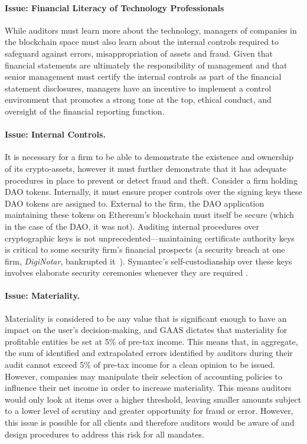\paragraph{Issue: Financial Literacy of Technology Professionals} While auditors must learn more about the technology, managers of companies in the blockchain space must also learn about the internal controls required to safeguard against errors, misappropriation of assets and fraud. Given that financial statements are ultimately the responsibility of management and that senior management must certify the internal controls as part of the financial statement disclosures, managers have an incentive to implement a control environment that promotes a strong tone at the top, ethical conduct, and oversight of the financial reporting function.

\paragraph{Issue: Internal Controls.} It is necessary for a firm to be able to demonstrate the existence and ownership of its crypto-assets, however it must further demonstrate that it has adequate procedures in place to prevent or detect fraud and theft. Consider a firm holding DAO tokens. Internally, it must ensure proper controls over the signing keys these DAO tokens are assigned to. External to the firm, the DAO application maintaining these tokens on Ethereum{'}s blockchain must itself be secure (which in the case of the DAO, it was not). Auditing internal procedures over cryptographic keys is not unprecedented---maintaining certificate authority keys is critical to some security firm{'}s financial prospects (a security breach at one firm, \textit{DigiNotar}, bankrupted it~\cite{zetter2011diginotar}). Symantec{'}s self-custodianship over these keys involves elaborate security ceremonies whenever they are required \todo{[Cite]}. 

\paragraph{Issue: Materiality.} Materiality is considered to be any value that is significant enough to have an impact on the user{'}s decision-making, and GAAS dictates that materiality for profitable entities be set at 5\% of pre-tax income. This means that, in aggregate, the sum of identified and extrapolated errors identified by auditors during their audit cannot exceed 5\% of pre-tax income for a clean opinion to be issued. However, companies may manipulate their selection of accounting policies to influence their net income in order to increase materiality. This means auditors would only look at items over a higher threshold, leaving smaller amounts subject to a lower level of scrutiny and greater opportunity for fraud or error. However, this issue is possible for all clients and therefore auditors would be aware of and design procedures to address this risk for all mandates.
 
